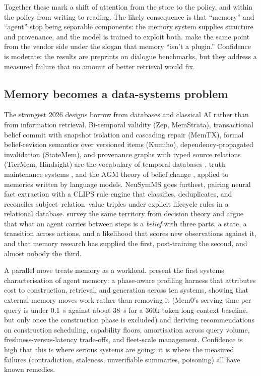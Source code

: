 \documentclass[11pt]{article}
\begin{document}
Together these mark a shift of attention from the store to the policy, and within the policy from writing to reading. The likely consequence is that ``memory'' and ``agent'' stop being separable components: the memory system supplies structure and provenance, and the model is trained to exploit both. \citet{wooders2026plugin} make the same point from the vendor side under the slogan that memory ``isn't a plugin.'' Confidence is moderate: the results are preprints on dialogue benchmarks, but they address a measured failure that no amount of better retrieval would fix.

\subsection{Memory becomes a data-systems problem}

The strongest 2026 designs borrow from databases and classical AI rather than from information retrieval. Bi-temporal validity (Zep, MemStrata), transactional belief commit with snapshot isolation and cascading repair (MemTX), formal belief-revision semantics over versioned items (Kumiho), dependency-propagated invalidation (StateMem), and provenance graphs with typed source relations (TierMem, Hindsight) are the vocabulary of temporal databases \citep{snodgrass1999temporal}, truth maintenance systems \citep{doyle1979tms}, and the AGM theory of belief change \citep{alchourron1985agm}, applied to memories written by language models. NeuSymMS \citep{sultan2026neusymms} goes furthest, pairing neural fact extraction with a CLIPS rule engine that classifies, deduplicates, and reconciles subject--relation--value triples under explicit lifecycle rules in a relational database. \citet{huang2026belief} survey the same territory from decision theory and argue that what an agent carries between steps is a \emph{belief} with three parts, a state, a transition across actions, and a likelihood that scores new observations against it, and that memory research has supplied the first, post-training the second, and almost nobody the third.

A parallel move treats memory as a workload. \citet{omri2026systems} present the first systems characterisation of agent memory: a phase-aware profiling harness that attributes cost to construction, retrieval, and generation across ten systems, showing that external memory moves work rather than removing it (Mem0's serving time per query is under 0.1~s against about 38~s for a 360k-token long-context baseline, but only once the construction phase is excluded) and deriving recommendations on construction scheduling, capability floors, amortisation across query volume, freshness-versus-latency trade-offs, and fleet-scale management. Confidence is high that this is where serious systems are going: it is where the measured failures (contradiction, staleness, unverifiable summaries, poisoning) all have known remedies.
\end{document}
